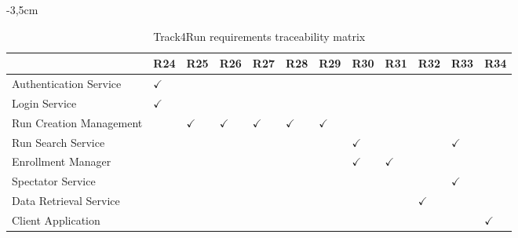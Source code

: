 \begin{table}
\begin{adjustwidth}{-3,5cm}{}
\captionsetup{justification=centering}
\caption{Track4Run requirements traceability matrix}
  \label{tab:table3}
\begin{tabular}{|l||l|l|l|l|l|l|l|l|l|l|l|}
\hline
\cellcolor[HTML]{EFEFEF}                      & \cellcolor[HTML]{EFEFEF}R24 & \cellcolor[HTML]{EFEFEF}R25 & \cellcolor[HTML]{EFEFEF}R26 & \cellcolor[HTML]{EFEFEF}R27 & \cellcolor[HTML]{EFEFEF}R28 & \cellcolor[HTML]{EFEFEF}R29 & \cellcolor[HTML]{EFEFEF}R30 & \cellcolor[HTML]{EFEFEF}R31 & \cellcolor[HTML]{EFEFEF}R32 & \cellcolor[HTML]{EFEFEF}R33 & \cellcolor[HTML]{EFEFEF}R34\\ \hline \hline
\cellcolor[HTML]{EFEFEF}Authentication Service & $\checkmark$  &   &  &    &   &   &   &    &   &   &   \\ \hline
\cellcolor[HTML]{EFEFEF}Login Service     &  $\checkmark$  &    &    &   &    &    &    &    &   &   &  \\ \hline
\cellcolor[HTML]{EFEFEF}Run Creation Management         &    & $\checkmark$   &  $\checkmark$  &  $\checkmark$  & $\checkmark$  &  $\checkmark$  &    &    &   &   & \\ \hline
\cellcolor[HTML]{EFEFEF}Run Search Service    &    &    &    &    &    &    &  $\checkmark$ &   &  & $\checkmark$ & \\ \hline
\cellcolor[HTML]{EFEFEF}Enrollment Manager  &    &    &    &    &    &    & $\checkmark$   &  $\checkmark$  &   &   & \\ \hline
\cellcolor[HTML]{EFEFEF}Spectator Service  &    &    &    &    &   &    &    &    &   &  $\checkmark$ & \\ \hline
\cellcolor[HTML]{EFEFEF}Data Retrieval Service  &    &    &    &    &    &    &    &    &  $\checkmark$   &   &  \\ \hline
\cellcolor[HTML]{EFEFEF}Client Application  &    &    &    &    &    &    &    &    &     &   & $\checkmark$ \\ \hline
\end{tabular}
\end{adjustwidth}
\end{table}